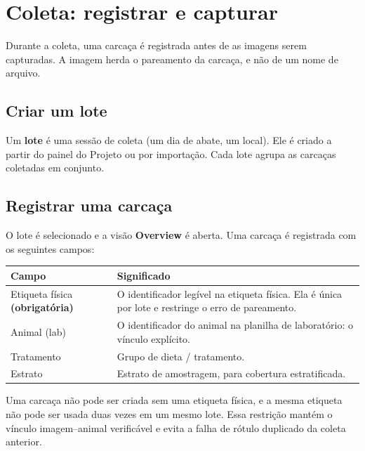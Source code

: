 \chapter{Coleta: registrar e capturar}


\vspace{4pt}
Durante a coleta, uma carcaça é registrada antes de as imagens serem capturadas.
A imagem herda o pareamento da carcaça, e não de um nome de arquivo.

\section{Criar um lote}

Um \textbf{lote} é uma sessão de coleta (um dia de abate, um local). Ele é criado
a partir do painel do Projeto ou por importação. Cada lote agrupa as carcaças
coletadas em conjunto.

\section{Registrar uma carcaça}

O lote é selecionado e a visão \textbf{Overview} é aberta. Uma carcaça é registrada
com os seguintes campos:

\begin{center}
\begin{tabularx}{\linewidth}{@{}l X@{}}
\toprule
\textbf{Campo} & \textbf{Significado} \\
\midrule
Etiqueta física \textbf{(obrigatória)} & O identificador legível na etiqueta física.
      Ela é única por lote e restringe o erro de pareamento. \\
Animal (lab) & O identificador do animal na planilha de laboratório: o vínculo explícito. \\
Tratamento & Grupo de dieta / tratamento. \\
Estrato & Estrato de amostragem, para cobertura estratificada. \\
\bottomrule
\end{tabularx}
\end{center}

\begin{caution}[title={A etiqueta física é obrigatória}]
Uma carcaça não pode ser criada sem uma etiqueta física, e a mesma etiqueta não pode
ser usada duas vezes em um mesmo lote. Essa restrição mantém o vínculo imagem--animal
verificável e evita a falha de rótulo duplicado da coleta anterior.
\end{caution}

